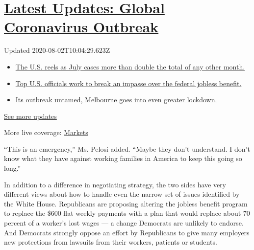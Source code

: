 \hypertarget{latest-updates-global-coronavirus-outbreak}{%
\section{\texorpdfstring{\href{https://www.nytimes.com/2020/08/01/world/coronavirus-covid-19.html?action=click\&pgtype=Article\&state=default\&region=MAIN_CONTENT_1\&context=storylines_live_updates}{Latest
Updates: Global Coronavirus
Outbreak}}{Latest Updates: Global Coronavirus Outbreak}}\label{latest-updates-global-coronavirus-outbreak}}

Updated 2020-08-02T10:04:29.623Z

\begin{itemize}
\tightlist
\item
  \href{https://www.nytimes.com/2020/08/01/world/coronavirus-covid-19.html?action=click\&pgtype=Article\&state=default\&region=MAIN_CONTENT_1\&context=storylines_live_updates\#link-34047410}{The
  U.S. reels as July cases more than double the total of any other
  month.}
\item
  \href{https://www.nytimes.com/2020/08/01/world/coronavirus-covid-19.html?action=click\&pgtype=Article\&state=default\&region=MAIN_CONTENT_1\&context=storylines_live_updates\#link-780ec966}{Top
  U.S. officials work to break an impasse over the federal jobless
  benefit.}
\item
  \href{https://www.nytimes.com/2020/08/01/world/coronavirus-covid-19.html?action=click\&pgtype=Article\&state=default\&region=MAIN_CONTENT_1\&context=storylines_live_updates\#link-2bc8948}{Its
  outbreak untamed, Melbourne goes into even greater lockdown.}
\end{itemize}

\href{https://www.nytimes.com/2020/08/01/world/coronavirus-covid-19.html?action=click\&pgtype=Article\&state=default\&region=MAIN_CONTENT_1\&context=storylines_live_updates}{See
more updates}

More live coverage:
\href{https://www.nytimes.com/live/2020/07/31/business/stock-market-today-coronavirus?action=click\&pgtype=Article\&state=default\&region=MAIN_CONTENT_1\&context=storylines_live_updates}{Markets}

``This is an emergency,'' Ms. Pelosi added. ``Maybe they don't
understand. I don't know what they have against working families in
America to keep this going so long.''

In addition to a difference in negotiating strategy, the two sides have
very different views about how to handle even the narrow set of issues
identified by the White House. Republicans are proposing altering the
jobless benefit program to replace the \$600 flat weekly payments with a
plan that would replace about 70 percent of a worker's lost wages --- a
change Democrats are unlikely to endorse. And Democrats strongly oppose
an effort by Republicans to give many employers new protections from
lawsuits from their workers, patients or students.

